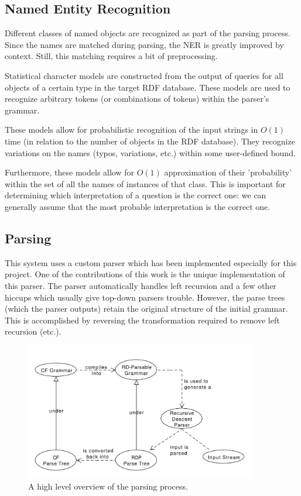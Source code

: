 \documentclass[11pt]{article}
\begin{document}
\subsection{Named Entity Recognition}
Different classes of named objects are recognized as part of the parsing process.
Since the names are matched during parsing, the NER is greatly improved by context.
Still, this matching requires a bit of preprocessing.

Statistical character models are constructed from the output of queries for all 
objects of a certain type in the target RDF database. 
These models are used to recognize arbitrary tokens (or combinations of 
tokens) within the parser's grammar. 

These models allow for probabilistic recognition of the input strings in 
$O(1)$ time (in relation to the number of objects in the RDF
database). They recognize variations on the names (typos, variations, etc.)
within some user-defined bound. 

Furthermore, these models allow for $O(1)$
approximation of their 'probability' within the set of all the names of instances
of that class. This is important for determining which interpretation of a
question is the correct one: we can generally assume that the most probable
interpretation is the correct one.

\subsection{Parsing}

This system uses a custom parser which has been implemented especially for
this project. One of the contributions of this work is the unique implementation
of this parser. The parser automatically handles left recursion and a few other
hiccups which usually give top-down parsers trouble. However, the parse trees
(which the parser outputs) retain the original structure of the initial grammar.
This is accomplished by reversing the transformation required to remove left
recursion (etc.).

\begin{figure}[h!]
    \centering
    \includegraphics[width=0.9\textwidth,natwidth=1,natheight=1]{umlet/high_level.pdf}
    \caption{A high level overview of the parsing process.}
    \label{fig:high_level_parse}
\end{figure}
\end{document}
